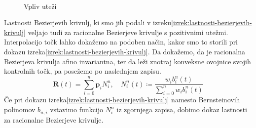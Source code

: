\documentclass[isrm2, tisk]{fmfdelo}
\newcommand{\p}{\textbf{p}}
\begin{document}
    \begin{figure}[h]
        \centering
        \qquad
        \\
        \qquad
        \caption{Vpliv uteži}
        \label{fig:uteži}
    \end{figure}

    Lastnosti Bezierjevih krivulj, ki smo jih podali v izreku\ref{izrek:lastnosti-bezierjevih-krivulj} veljajo tudi za racionalne Bezierjeve krivulje s pozitivnimi utežmi.
    Interpolacijo točk lahko dokažemo na podoben način, kakor smo to storili pri dokazu izreka\ref{izrek:lastnosti-bezierjevih-krivulj}.
    Da dokažemo, da je racionalna Bezierjeva krivulja afino invariantna, ter da leži znotraj konveksne ovojnice svojih kontrolnih točk, pa posežemo po naslednjem zapisu.
    \[\mathbf{R}(t)=\sum^n_{i=0}\p_i N^n_i, \quad N^n_i(t)\coloneqq \frac{w_i b^n_i(t)}{\sum^n_{i=0}w_i b^n_i(t)}\]
    Če pri dokazu izreka\ref{izrek:lastnosti-bezierjevih-krivulj} namesto Bernsteinovih polinomov $b_{n,i}$ vstavimo funkcijo $N^n_i$ iz zgornjega zapisa, dobimo dokaz lastnosti za racionalne Bezierjeve krivulje.
\end{document}
